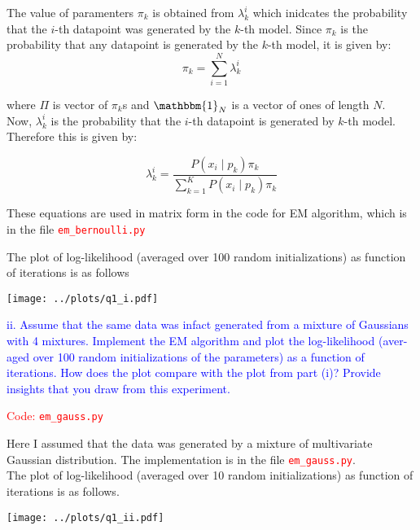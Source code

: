 The value of paramenters $\pi_k$ is obtained from $\lambda_k^i$ which inidcates the probability that the $i$-th datapoint was generated by the $k$-th model. Since $\pi_k$ is the probability that any datapoint is generated by the $k$-th model, it is given by:\\

$$
	\pi_k = \sum_{i = 1}^{N} \lambda_k^i
$$



where $\Pi$ is vector of $\pi_{k}$s and $\mathbbm{1}_N$ is a vector of ones of length $N$.\\
Now, $\lambda_k^i$ is the probability that the $i$-th datapoint is generated by $k$-th model. Therefore this is given by:

$$
	\lambda_k^i = \frac{P(x_i \mid p_k) \pi_k}{\sum_{k = 1}^KP(x_i \mid p_k) \pi_k}
$$

These equations are used in  matrix form in the code for EM algorithm, which is in the file \textcolor{red}{\texttt{em\_bernoulli.py}}

\pagebreak

The plot of log-likelihood (averaged over 100 random initializations) as function of iterations is as follows

\begin{center}
	\texttt{[image: ../plots/q1\_i.pdf]}	
\end{center}


\vspace*{24pt}
\textcolor{blue}{
ii. Assume that the same data was infact generated from a mixture of Gaussians
with 4 mixtures. Implement the EM algorithm and plot the log-likelihood (aver-
aged over 100 random initializations of the parameters) as a function of iterations.
How does the plot compare with the plot from part (i)? Provide insights that
you draw from this experiment.
}

\textcolor{red}{Code: \texttt{em\_gauss.py}}

Here I assumed that the data was generated by a mixture of multivariate Gaussian distribution. The implementation is in the file \textcolor{red}{\texttt{em\_gauss.py}}.\\
The plot of log-likelihood (averaged over 10 random initializations) as function of iterations is as follows.\\


\begin{center}
	\texttt{[image: ../plots/q1\_ii.pdf]}	
\end{center}

